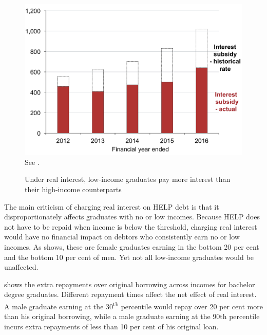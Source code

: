 \documentclass[embargoed]{grattan}
\begin{document}
\begin{figure}
\caption{Under real interest, low-income graduates pay more interest than their high-income counterparts}\label{fig:fig13-under-real-interest-low-income-grads-pay-more-interest-than-high-income-counterparts}


\includegraphics[page=13]{atlas/Chartpack.pdf}
%
{See .}
\end{figure}

The main criticism of charging real interest on \gls{HELP} debt is that it disproportionately affects graduates with no or low incomes.
Because \gls{HELP} does not have to be repaid when income is below the threshold, charging real interest would have no financial impact on debtors who consistently earn no or low incomes.
As  shows, these are female graduates earning in the bottom 20 per cent and the bottom 10 per cent of men.
Yet not all low-income graduates would be unaffected.

 shows the extra repayments over original borrowing across incomes for bachelor degree graduates.
Different repayment times affect the net effect of real interest.
A male graduate earning at the 30\textsuperscript{th} percentile would repay over 20 per cent more than his original borrowing, while a male graduate earning at the 90th percentile incurs extra repayments of less than 10 per cent of his original loan.
\end{document}
